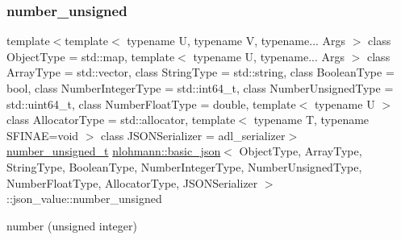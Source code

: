\subsubsection{\texorpdfstring{number\_unsigned}{number\_unsigned}}
{\footnotesize\ttfamily template$<$template$<$ typename U, typename V, typename... Args $>$ class Object\+Type = std\+::map, template$<$ typename U, typename... Args $>$ class Array\+Type = std\+::vector, class String\+Type  = std\+::string, class Boolean\+Type  = bool, class Number\+Integer\+Type  = std\+::int64\+\_\+t, class Number\+Unsigned\+Type  = std\+::uint64\+\_\+t, class Number\+Float\+Type  = double, template$<$ typename U $>$ class Allocator\+Type = std\+::allocator, template$<$ typename T, typename S\+F\+I\+N\+A\+E=void $>$ class J\+S\+O\+N\+Serializer = adl\+\_\+serializer$>$ \\
\mbox{\hyperlink{classnlohmann_1_1basic__json_ab906e29b5d83ac162e823ada2156b989}{number\+\_\+unsigned\+\_\+t}} \mbox{\hyperlink{classnlohmann_1_1basic__json}{nlohmann\+::basic\+\_\+json}}$<$ Object\+Type, Array\+Type, String\+Type, Boolean\+Type, Number\+Integer\+Type, Number\+Unsigned\+Type, Number\+Float\+Type, Allocator\+Type, J\+S\+O\+N\+Serializer $>$\+::json\+\_\+value\+::number\+\_\+unsigned}



number (unsigned integer) 

\mbox{\label{unionnlohmann_1_1basic__json_1_1json__value_a4a2209bb26e7088cd36bf24824ab5521}} 
